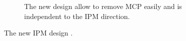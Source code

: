 \begin{figure}[!ht]
\begin{subfigure}[t]{0.75\textwidth}
		\caption{The new design allow to remove MCP easily and is independent to the IPM direction.}
		\label{}
	\end{subfigure}
	\caption[The new IPM design]{The new IPM design \cite{JacquesCDR2019}.}
	\label{chap5:fig:bride_double}
\end{figure}